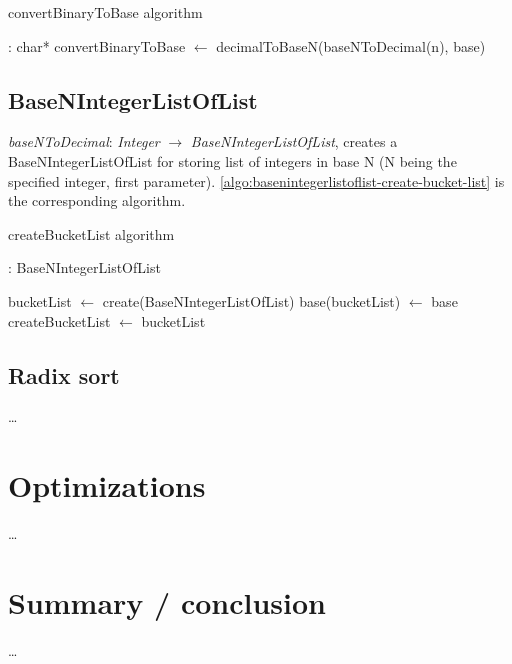 \documentclass[book, nodocumentinfo]{upmethodology-document}
\begin{document}
\begin{algorithm}[H]
    \label{algo:basenintegerlist-convert-binary-to-base}
    \caption{convertBinaryToBase algorithm}

    \begin{algorithmic}
         : char*
            \State convertBinaryToBase \(\leftarrow\) decimalToBaseN(baseNToDecimal(n), base)
        \EndFunction
    \end{algorithmic}
\end{algorithm}

\section{BaseNIntegerListOfList}

\emph{baseNToDecimal}: \emph{Integer} \(\rightarrow\) \emph{BaseNIntegerListOfList},
creates a BaseNIntegerListOfList for storing list of integers in base N (N being the specified integer, first parameter).
\ref{algo:basenintegerlistoflist-create-bucket-list} is the corresponding algorithm.

\begin{algorithm}[H]
    \label{algo:basenintegerlistoflist-create-bucket-list}
    \caption{createBucketList algorithm}

    \begin{algorithmic}
         : BaseNIntegerListOfList

            \State bucketList \(\leftarrow \) create(BaseNIntegerListOfList)
            \State base(bucketList) \(\leftarrow \) base
            \State createBucketList \(\leftarrow \) bucketList

        \EndFunction
    \end{algorithmic}
\end{algorithm}

\section{Radix sort}

…

\chapter{Optimizations}

…

\chapter{Summary / conclusion}

…



{}
\end{document}
